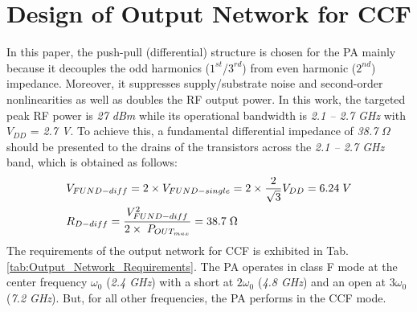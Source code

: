 \documentclass[conference]{IEEEtran}
\begin{document}
\section{Design of Output Network for CCF}
\label{section:ON}
In this paper, the push-pull (differential) structure is chosen for the PA mainly because it decouples the odd harmonics ($1^{st}$/$3^{rd}$) from even harmonic ($2^{nd}$) impedance. Moreover, it suppresses supply/substrate noise and second-order nonlinearities as well as doubles the RF output power. 
In this work, the targeted peak RF power is \textit{27 dBm}  while its operational bandwidth is \textit{2.1 -- 2.7 GHz} with $V_{DD}$ = \textit{2.7 V}. To achieve this, a  fundamental differential impedance of \textit{38.7} $\Omega$ should be presented to the drains of the transistors across the \textit{2.1 -- 2.7 GHz} band, which is obtained as follows:
\vspace{-0.05in}
\begin{equation}
\begin{aligned}
&V_{FUND-diff}=2\times V_{FUND-single}=2\times\frac{2}{\sqrt{3}} V_{DD}=6.24 \hspace{1mm}V\\
&R_{D-diff}=\frac{V_{FUND-diff}^{2}}{2\times\hspace{1mm} P_{OUT_{max}}}=38.7 \hspace{1mm} \Omega
\label{eqn_diff_imp}
\end{aligned}
\end{equation}
The requirements of the output network for CCF is exhibited in Tab. \ref{tab:Output_Network_Requirements}. The PA operates in class F mode at the center frequency $\omega_0$ (\textit{2.4 GHz}) with a short at $2\omega_0$ (\textit{4.8 GHz}) and an open at $3\omega_0$ (\textit{7.2 GHz}). But, for all other frequencies, the PA performs in the CCF mode. 
\end{document}
